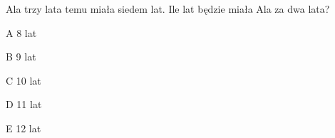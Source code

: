 \begin{tresc}
Ala trzy lata temu miała siedem lat. Ile lat będzie miała Ala za dwa lata?
\end{tresc}
\begin{wariant}{A} 8 lat \end{wariant}
\begin{wariant}{B} 9 lat \end{wariant}
\begin{wariant}{C} 10 lat \end{wariant}
\begin{wariant}{D} 11 lat \end{wariant}
\begin{wariant}{E} 12 lat \end{wariant}
